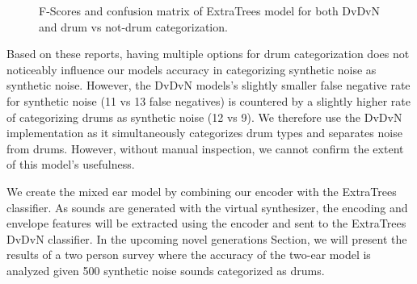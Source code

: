 \documentclass[\main/thesis.tex]{subfiles}
\begin{document}
\begin{figure}[htbp!]
\begin{center}
\end{center}


\caption{F-Scores and confusion matrix of ExtraTrees model for both DvDvN and drum vs not-drum categorization.}
\label{fig:conf_f1_dvn}
\end{figure}

Based on these reports, having multiple options for drum categorization does not noticeably influence our models accuracy in categorizing synthetic noise as synthetic noise. However, the DvDvN models's slightly smaller false negative rate for synthetic noise (11 vs 13 false negatives) is countered by a slightly higher rate of categorizing drums as synthetic noise (12 vs 9).  We therefore use the DvDvN implementation as it simultaneously categorizes drum types and separates noise from drums. However, without manual inspection, we cannot confirm the extent of this model's usefulness. 

We create the mixed ear model by combining our encoder with the ExtraTrees classifier. As sounds are generated with the virtual synthesizer, the encoding and envelope features will be extracted using the encoder and sent to the ExtraTrees DvDvN classifier. In the upcoming novel generations Section, we will present the results of a two person survey where the accuracy of the two-ear model is analyzed given 500 synthetic noise sounds categorized as drums. 
\end{document}
